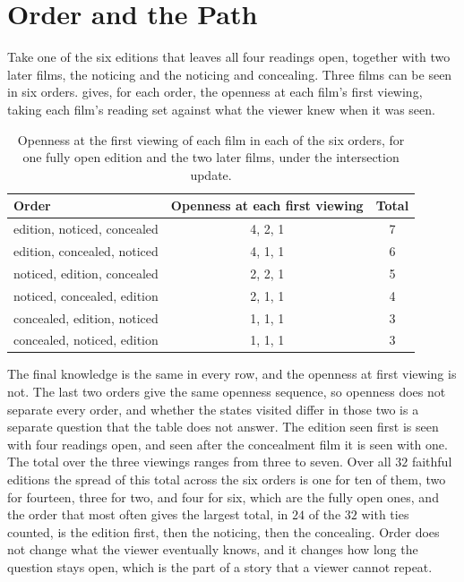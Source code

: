 \documentclass[11pt,twoside,openright]{book}
\theoremstyle{plain}
\theoremstyle{definition}
\theoremstyle{remark}
\begin{document}
\section{Order and the Path}\label{sec:path14}

Take one of the six editions that leaves all four readings open, together with two later films, the noticing and the noticing and concealing. Three films can be seen in six orders.  gives, for each order, the openness at each film's first viewing, taking each film's reading set against what the viewer knew when it was seen.

\begin{table}[ht]
\centering
\begin{tabular}{@{}lcc@{}}
\toprule
Order & Openness at each first viewing & Total\\
\midrule
edition, noticed, concealed & 4, 2, 1 & 7\\
edition, concealed, noticed & 4, 1, 1 & 6\\
noticed, edition, concealed & 2, 2, 1 & 5\\
noticed, concealed, edition & 2, 1, 1 & 4\\
concealed, edition, noticed & 1, 1, 1 & 3\\
concealed, noticed, edition & 1, 1, 1 & 3\\
\bottomrule
\end{tabular}
\caption{Openness at the first viewing of each film in each of the six orders, for one fully open edition and the two later films, under the intersection update.}\label{tab:order14}
\end{table}

The final knowledge is the same in every row, and the openness at first viewing is not. The last two orders give the same openness sequence, so openness does not separate every order, and whether the states visited differ in those two is a separate question that the table does not answer. The edition seen first is seen with four readings open, and seen after the concealment film it is seen with one. The total over the three viewings ranges from three to seven. Over all $32$ faithful editions the spread of this total across the six orders is one for ten of them, two for fourteen, three for two, and four for six, which are the fully open ones, and the order that most often gives the largest total, in $24$ of the $32$ with ties counted, is the edition first, then the noticing, then the concealing. Order does not change what the viewer eventually knows, and it changes how long the question stays open, which is the part of a story that a viewer cannot repeat.
\end{document}
